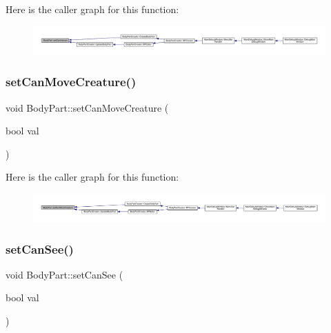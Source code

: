Here is the caller graph for this function\+:
\nopagebreak
\begin{figure}[H]
\begin{center}
\leavevmode
\includegraphics[width=350pt]{d2/d6f/class_body_part_acb68020a45ea6f0d14b963b3159317a2_icgraph}
\end{center}
\end{figure}
\mbox{\label{class_body_part_a8a6352fc3a764e8358f52f17caaa2867}} 
\subsubsection{\texorpdfstring{set\+Can\+Move\+Creature()}{setCanMoveCreature()}}
{\footnotesize\ttfamily void Body\+Part\+::set\+Can\+Move\+Creature (\begin{DoxyParamCaption}\item[{bool}]{val }\end{DoxyParamCaption})}

Here is the caller graph for this function\+:
\nopagebreak
\begin{figure}[H]
\begin{center}
\leavevmode
\includegraphics[width=350pt]{d2/d6f/class_body_part_a8a6352fc3a764e8358f52f17caaa2867_icgraph}
\end{center}
\end{figure}
\mbox{\label{class_body_part_acc7c6792cd9837901dfb7d639714eb00}} 
\subsubsection{\texorpdfstring{set\+Can\+See()}{setCanSee()}}
{\footnotesize\ttfamily void Body\+Part\+::set\+Can\+See (\begin{DoxyParamCaption}\item[{bool}]{val }\end{DoxyParamCaption})}


